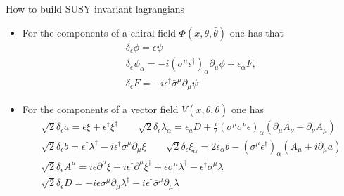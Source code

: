 \documentclass[10pt]{beamer}
\begin{document}
\begin{frame}{How to build SUSY invariant lagrangians}
\begin{itemize}
    \item For the components of a chiral field $\Phi(x, \theta, \bar\theta)$ one has that
        \begin{gather*}
                \delta_{\epsilon} \phi =\epsilon \psi \\
                \delta_{\epsilon} \psi_{\alpha} =-i\left(\sigma^{\mu} \epsilon^{\dagger}\right)_{\alpha} \partial_{\mu} \phi+\epsilon_{\alpha} F, \\
                \boxed{\delta_{\epsilon} F =-i \epsilon^{\dagger} \bar{\sigma}^{\mu} \partial_{\mu} \psi}
        \end{gather*}
    \item For the components of a vector field $V(x, \theta, \bar\theta)$ one has
        \begin{gather*}
                \sqrt{2} \delta_{\epsilon} a =\epsilon \xi+\epsilon^{\dagger} \xi^{\dagger} \qquad 
                \sqrt{2} \delta_{\epsilon} \lambda_{\alpha} =\epsilon_{a} D+\frac{i}{2}\left(\sigma^{\mu} \sigma^{\nu} \epsilon\right)_{\alpha}\left(\partial_{\mu} A_{\nu}-\partial_{\nu} A_{\mu}\right) \\
                \sqrt{2} \delta_{\epsilon} b =\epsilon^{\dagger} \lambda^{\dagger}-i \epsilon^{\dagger} \sigma^{\mu} \partial_{\mu} \xi \qquad
                \sqrt{2} \delta_{\epsilon} \xi_{\alpha} =2 \epsilon_{\alpha} b-\left(\sigma^{\mu} \epsilon^{\dagger}\right)_{\alpha}\left(A_{\mu}+i \partial_{\mu} a\right) \\
                \sqrt{2} \delta_{\epsilon} A^{\mu} =i \epsilon \partial^{\mu} \xi-i \epsilon^{\dagger} \partial^{\mu} \xi^{\dagger}+\epsilon \sigma^{\mu} \lambda^{\dagger}-\epsilon^{\dagger} \bar{\sigma}^{\mu} \lambda \\
                \boxed{\sqrt{2} \delta_{\epsilon} D =-i \epsilon \sigma^{\mu} \partial_{\mu} \lambda^{\dagger}-i \epsilon^{\dagger} \bar{\sigma}^{\mu} \partial_{\mu} \lambda}
        \end{gather*}
\end{itemize}
\end{frame}
\end{document}
